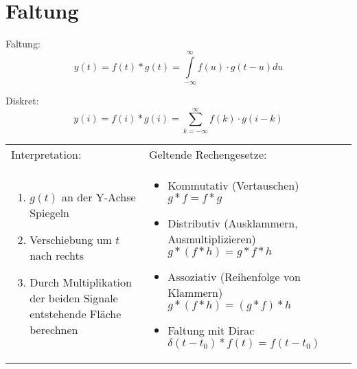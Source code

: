 \section{Faltung}
Faltung:
\begin{equation}
  \nonumber
  y(t) = f(t) \ast g(t) = \int\limits_{-\infty}^{\infty}f(u) \cdot g(t-u) du
\end{equation}

Diskret:
\begin{equation}
  \nonumber
  y(i)=f(i) \ast g(i)=\sum\limits_{k=-\infty}^{\infty}f(k)\cdot g(i-k)
\end{equation}

\begin{tabular}{p{9cm}p{9cm}}
  Interpretation: & Geltende Rechengesetze:\\
  \begin{enumerate}
    \item $g(t)$ an der Y-Achse Spiegeln
	  \item Verschiebung um $t$ nach rechts
	  \item Durch Multiplikation der beiden Signale entstehende Fläche berechnen
  \end{enumerate}
&
  \begin{itemize}
    \item Kommutativ (Vertauschen) $g \ast f = f \ast g $
	  \item Distributiv (Ausklammern, Ausmultiplizieren) $g \ast(f \ast h) = g \ast f \ast h$
	  \item Assoziativ (Reihenfolge von Klammern) $g \ast(f \ast h) = (g \ast f) \ast h$
	  \item Faltung mit Dirac $\delta(t-t_0) \ast f(t) = f(t-t_0)$
  \end{itemize}
\end{tabular}
	
	
	

